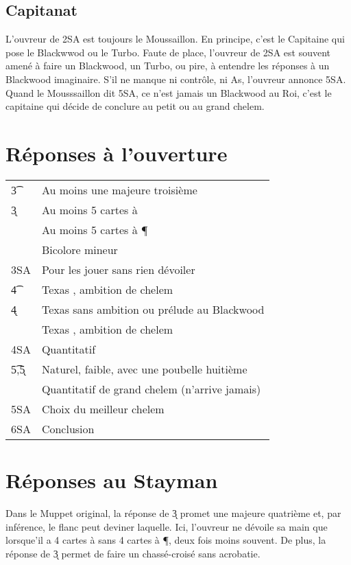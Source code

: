 \documentclass[a4paper,12pt]{article}
\begin{document}
\subsection*{Capitanat}

L'ouvreur de 2SA est toujours le Moussaillon. En principe, c'est le Capitaine qui pose le Blackwwod ou le Turbo. Faute de place, l'ouvreur de 2SA est souvent amené à faire un Blackwood, un Turbo, ou pire, à entendre les réponses à un Blackwood imaginaire. S'il ne manque ni contrôle, ni As, l'ouvreur annonce 5SA. Quand le Mousssaillon dit 5SA, ce n'est jamais un Blackwood au Roi, c'est le capitaine qui décide de conclure au petit ou au grand chelem. 

\section*{Réponses à l'ouverture}

\begin{tabular}{ll}
 \t3 & Au moins une majeure troisième\\
 \k3 & Au moins 5 cartes à \C\\
 \co3 & Au moins 5 cartes à \P\\
 \p3  & Bicolore mineur     \\
 3SA  & Pour les jouer sans rien dévoiler\\
 \t4 & Texas \K, ambition de chelem\\
 \k4 \co4 & Texas sans ambition ou prélude au Blackwood\\
 \p4 & Texas \T, ambition de chelem\\
 4SA & Quantitatif\\
 \t5,\k5 & Naturel, faible, avec une poubelle huitième\\ 
 \p5 & Quantitatif de grand chelem (n'arrive jamais)\\
 5SA & Choix du meilleur chelem\\
 6SA & Conclusion \\
\end{tabular}

\section*{Réponses au Stayman}

Dans le Muppet original, la réponse de \k3 promet une majeure quatrième et, par inférence, le flanc peut deviner laquelle. Ici, l'ouvreur ne dévoile sa main que lorsque'il a 4 cartes à \C sans 4 cartes à \P, deux fois moins souvent. De plus, la réponse de \k3 permet de faire un chassé-croisé sans acrobatie.
\end{document}
